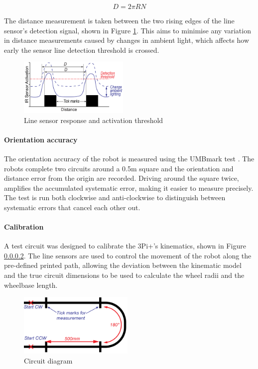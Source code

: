 \documentclass[conference]{IEEEtran}
\begin{document}
\begin{equation}
    D = 2 \pi R N
\end{equation}

The distance measurement is taken between the two rising edges of the line sensor's detection signal, shown in Figure \ref{fig:linesensor}.
This aims to minimise any variation in distance measurements caused by changes in ambient light, which affects how early the sensor line detection threshold is crossed.

\begin{figure}[h!]
    \centering
    \includegraphics[width = 0.47\textwidth]{img/linesensor_response.png}
    \caption{Line sensor response and activation threshold}
    \label{fig:linesensor}
\end{figure}

\paragraph{Orientation accuracy}
The orientation accuracy of the robot is measured using the UMBmark test \cite{UMBmark}. 
The robots complete two circuits around a 0.5m square and the orientation and distance error from the origin are recorded.
Driving around the square twice, amplifies the accumulated systematic error, making it easier to measure precisely. 
The test is run both clockwise and anti-clockwise to distinguish between systematic errors that cancel each other out.

\paragraph{Calibration}
A test circuit was designed to calibrate the 3Pi+’s kinematics, shown in Figure \ref{}. 
The line sensors are used to control the movement of the robot along the pre-defined printed path, allowing the deviation between the kinematic model and the true circuit dimensions to be used to calculate the wheel radii and the wheelbase length.

\begin{figure}[h!]
    \centering
    \includegraphics[width = 0.49\textwidth]{img/calibration_circuit.png}
    \caption{Circuit diagram}
    \label{fig:calibration_circuit}
\end{figure}
\end{document}
